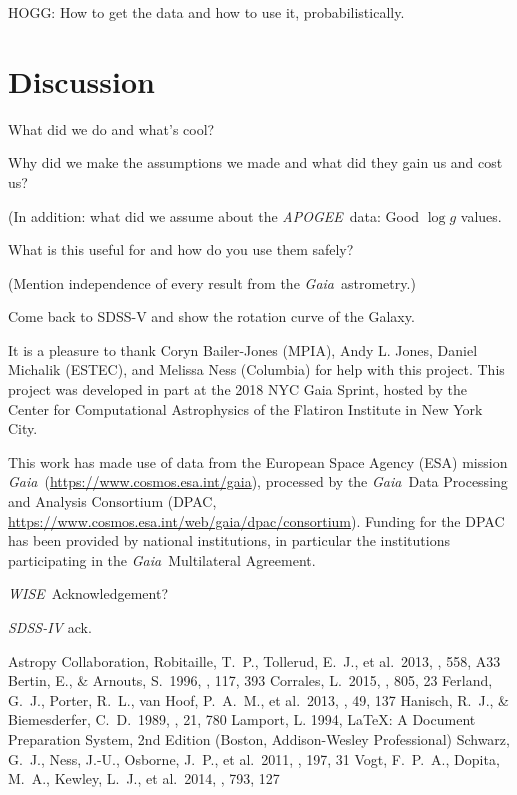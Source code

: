 \documentclass[modern]{aastex62}
\newcommand{\acronym}[1]{{\small{#1}}}
\newcommand{\project}[1]{\textsl{#1}}
\newcommand{\apogee}{\project{\acronym{APOGEE}}}
\newcommand{\gaia}{\project{Gaia}}
\newcommand{\wise}{\project{\acronym{WISE}}}
\newcommand{\logg}{\log g}
\begin{document}
HOGG: How to get the data and how to use it, probabilistically.

\section{Discussion}

What did we do and what's cool?

Why did we make the assumptions we made and what did they gain us and cost us?

(In addition: what did we assume about the \apogee\ data: Good $\logg$ values.

What is this useful for and how do you use them safely?

(Mention independence of every result from the \gaia\ astrometry.)

Come back to SDSS-V and show the rotation curve of the Galaxy.

\acknowledgements
It is a pleasure to thank
  Coryn Bailer-Jones (\acronym{MPIA}),
  Andy L. Jones,
  Daniel Michalik (\acronym{ESTEC}), and
  Melissa Ness (Columbia)
for help with this project.
This project was developed in part at the
2018 \acronym{NYC} Gaia Sprint, hosted by the Center for Computational Astrophysics of
the Flatiron Institute in New York City.

This work has made use of data from the European Space Agency (ESA) mission
\gaia\ (\url{https://www.cosmos.esa.int/gaia}), processed by the \gaia\ Data
Processing and Analysis Consortium (\acronym{DPAC},
\url{https://www.cosmos.esa.int/web/gaia/dpac/consortium}). Funding for the
\acronym{DPAC}
has been provided by national institutions, in particular the institutions
participating in the \gaia\ Multilateral Agreement.

\wise\ Acknowledgement?

\project{\acronym{SDSS-IV}} ack.

\begin{thebibliography}{}
 Astropy Collaboration, Robitaille, T.~P., Tollerud, E.~J., et al.\ 2013, \aap, 558, A33 
 Bertin, E., \& Arnouts, S.\ 1996, \aaps, 117, 393 
 Corrales, L.\ 2015, \apj, 805, 23
 Ferland, G.~J., Porter, R.~L., van Hoof, P.~A.~M., et al.\ 2013, \rmxaa, 49, 137
 Hanisch, R.~J., \& Biemesderfer, C.~D.\ 1989, \baas, 21, 780 
 Lamport, L. 1994, LaTeX: A Document Preparation System, 2nd Edition (Boston, Addison-Wesley Professional)
 Schwarz, G.~J., Ness, J.-U., Osborne, J.~P., et al.\ 2011, \apjs, 197, 31  
 Vogt, F.~P.~A., Dopita, M.~A., Kewley, L.~J., et al.\ 2014, \apj, 793, 127  
\end{thebibliography}
\end{document}
